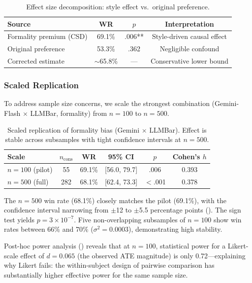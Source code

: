 \documentclass[11pt,a4paper]{article}
\begin{document}
\begin{table}[t]
\centering
\small
\caption{Effect size decomposition: style effect vs.\ original preference.}
\label{tab:decomp}
\begin{tabular}{lccc}
\toprule
\textbf{Source} & \textbf{WR} & $p$ & \textbf{Interpretation} \\
\midrule
Formality premium (CSD)   & 69.1\% & .006** & Style-driven causal effect \\
Original preference        & 53.3\% & .362   & Negligible confound \\
Corrected estimate         & $\sim$65.8\% & ---    & Conservative lower bound \\
\bottomrule
\end{tabular}
\end{table}

\subsubsection{Scaled Replication}
\label{sec:scaled}

To address sample size concerns, we scale the strongest combination (Gemini-Flash $\times$ LLMBar, formality) from $n=100$ to $n=500$.

\begin{table}[t]
\centering
\small
\caption{Scaled replication of formality bias (Gemini $\times$ LLMBar). Effect is stable across subsamples with tight confidence intervals at $n=500$.}
\label{tab:scaled}
\begin{tabular}{lccccc}
\toprule
\textbf{Scale} & $n_\text{cons}$ & \textbf{WR} & \textbf{95\% CI} & $p$ & \textbf{Cohen's $h$} \\
\midrule
$n=100$ (pilot) & 55  & 69.1\% & [56.0, 79.7] & .006   & 0.393 \\
$n=500$ (full)  & 282 & 68.1\% & [62.4, 73.3] & $<$\!.001 & 0.378 \\
\bottomrule
\end{tabular}
\end{table}

The $n=500$ win rate (68.1\%) closely matches the pilot (69.1\%), with the confidence interval narrowing from $\pm$12 to $\pm$5.5 percentage points ().
The sign test yields $p = 3 \times 10^{-7}$.
Five non-overlapping subsamples of $n=100$ show win rates between 66\% and 70\% ($\sigma^2 = 0.0003$), demonstrating high stability.

Post-hoc power analysis () reveals that at $n=100$, statistical power for a Likert-scale effect of $d=0.065$ (the observed ATE magnitude) is only 0.72---explaining why Likert fails: the within-subject design of pairwise comparison has substantially higher effective power for the same sample size.
\end{document}
